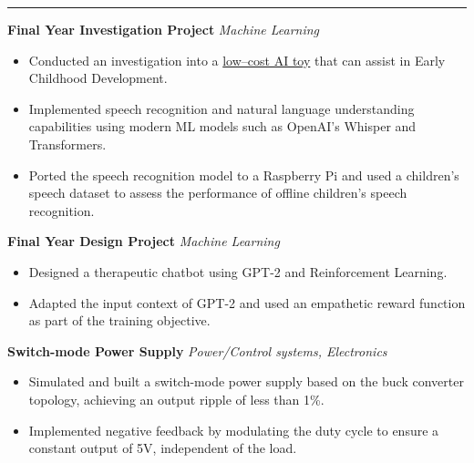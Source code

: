 \documentclass[10pt, a4paper]{article}
\newcommand{\contentType}[1]{\textit{#1}}
\newcommand{\heading}[1]{
\makebox[0pt][l]{\Large \sc \hspace{2pt}#1}
\rule[-0.7ex]{\columnwidth}{0.5pt}\vspace{1.0ex}
}
\newcommand{\subheading}[1]{{\bfseries #1}}
\newcommand{\subheadSkip}{\vspace{0.7ex}}
\newenvironment{mysection}[1]
{\vspace{2.5ex}
\heading{#1}
\begin{adjustwidth}{0.3cm}{0cm}}
{\end{adjustwidth} }
\begin{document}
\begin{mysection}{Projects}
    
    \subheading{Final Year Investigation Project} \hfill \contentType{Machine Learning}
         
     \begin{itemize}
     \item       Conducted an investigation into a \href{https://github.com/RyanSelesnik/AI-Toy}{low--cost AI toy} that can assist in Early Childhood Development. 

         \item Implemented speech recognition and natural language understanding capabilities using modern ML models such as OpenAI's Whisper and Transformers.
            \item Ported the speech recognition model to a Raspberry Pi and used a children's speech dataset to assess the performance of offline children's speech recognition.
     \end{itemize} 
\subheadSkip   
\subheading{Final Year Design Project} \hfill \contentType{Machine Learning}
 \begin{itemize}
     \item Designed a therapeutic chatbot using GPT-2 and Reinforcement Learning.
     \item Adapted the input context of GPT-2 and used an empathetic reward function as part of the training objective.
 \end{itemize} 

 \subheadSkip
 \subheading{Switch-mode Power Supply} \hfill \contentType{Power/Control systems, Electronics}
\begin{itemize}
    \item Simulated and built a switch-mode power supply based on the buck converter topology, achieving an output ripple of less than 1\%.
    \item Implemented negative feedback by modulating the duty cycle to ensure a constant output of 5V, independent of the load. 
\end{itemize}


\end{mysection}
\end{document}
